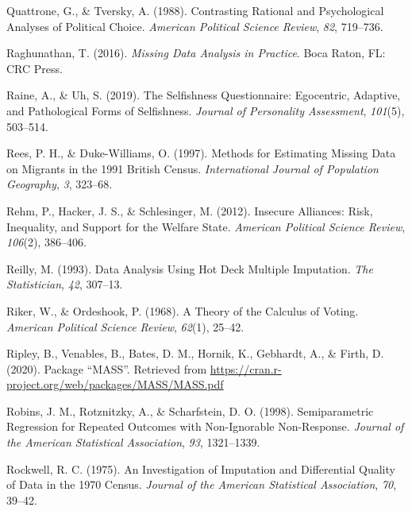 \documentclass[12pt,econ]{sources/authesis}
\begin{document}
\leavevmode\hypertarget{ref-quattrone_1988_contrasting}{}%
Quattrone, G., \& Tversky, A. (1988). Contrasting Rational and Psychological Analyses of Political Choice. \emph{American Political Science Review}, \emph{82}, 719--736.

\leavevmode\hypertarget{ref-raghunathan_2016_missing}{}%
Raghunathan, T. (2016). \emph{Missing Data Analysis in Practice}. Boca Raton, FL: CRC Press.

\leavevmode\hypertarget{ref-raine_2019_selfishness}{}%
Raine, A., \& Uh, S. (2019). The Selfishness Questionnaire: Egocentric, Adaptive, and Pathological Forms of Selfishness. \emph{Journal of Personality Assessment}, \emph{101}(5), 503--514.

\leavevmode\hypertarget{ref-rees_1997_methods}{}%
Rees, P. H., \& Duke-Williams, O. (1997). Methods for Estimating Missing Data on Migrants in the 1991 British Census. \emph{International Journal of Population Geography}, \emph{3}, 323--68.

\leavevmode\hypertarget{ref-rehm_2012_insecure}{}%
Rehm, P., Hacker, J. S., \& Schlesinger, M. (2012). Insecure Alliances: Risk, Inequality, and Support for the Welfare State. \emph{American Political Science Review}, \emph{106}(2), 386--406.

\leavevmode\hypertarget{ref-reilly_1993_data}{}%
Reilly, M. (1993). Data Analysis Using Hot Deck Multiple Imputation. \emph{The Statistician}, \emph{42}, 307--13.

\leavevmode\hypertarget{ref-riker_theory_1968}{}%
Riker, W., \& Ordeshook, P. (1968). A Theory of the Calculus of Voting. \emph{American Political Science Review}, \emph{62}(1), 25--42.

\leavevmode\hypertarget{ref-ripley_2020_package}{}%
Ripley, B., Venables, B., Bates, D. M., Hornik, K., Gebhardt, A., \& Firth, D. (2020). Package ``MASS''. Retrieved from \url{https://cran.r-project.org/web/packages/MASS/MASS.pdf}

\leavevmode\hypertarget{ref-robins_1998_semiparametric}{}%
Robins, J. M., Rotznitzky, A., \& Scharfstein, D. O. (1998). Semiparametric Regression for Repeated Outcomes with Non-Ignorable Non-Response. \emph{Journal of the American Statistical Association}, \emph{93}, 1321--1339.

\leavevmode\hypertarget{ref-rockwell_1975_investigation}{}%
Rockwell, R. C. (1975). An Investigation of Imputation and Differential Quality of Data in the 1970 Census. \emph{Journal of the American Statistical Association}, \emph{70}, 39--42.
\end{document}
